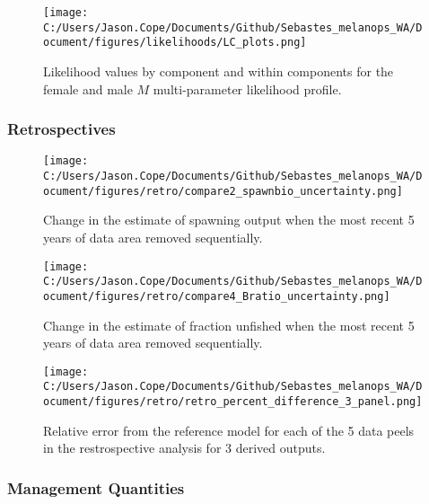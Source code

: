 \documentclass[11pt,
  letterpaper,
]{article}
\begin{document}
\pagebreak

\begin{figure}
{\centering
\texttt{[image: C:/Users/Jason.Cope/Documents/Github/Sebastes\_melanops\_WA/Document/figures/likelihoods/LC\_plots.png]}
}
\caption{Likelihood values by component and within components for the female and male $M$ multi-parameter likelihood profile.\label{fig:M-multiprofile-like-components}}
\end{figure}

\newpage

\hypertarget{retrospectives}{%
\subsubsection{Retrospectives}\label{retrospectives}}

\begin{figure}
{\centering
\texttt{[image: C:/Users/Jason.Cope/Documents/Github/Sebastes\_melanops\_WA/Document/figures/retro/compare2\_spawnbio\_uncertainty.png]}
}
\caption{Change in the estimate of spawning output when the most recent 5 years of data area removed sequentially.\label{fig:retro-ssb}}
\end{figure}

\pagebreak

\begin{figure}
{\centering
\texttt{[image: C:/Users/Jason.Cope/Documents/Github/Sebastes\_melanops\_WA/Document/figures/retro/compare4\_Bratio\_uncertainty.png]}
}
\caption{Change in the estimate of fraction unfished when the most recent 5 years of data area removed sequentially.\label{fig:retro-depl}}
\end{figure}

\newpage

\begin{figure}
{\centering
\texttt{[image: C:/Users/Jason.Cope/Documents/Github/Sebastes\_melanops\_WA/Document/figures/retro/retro\_percent\_difference\_3\_panel.png]}
}
\caption{Relative error from the reference model for each of the 5 data peels in the restrospective analysis for 3 derived outputs.\label{fig:retro-RE_comps}}
\end{figure}

\newpage

\hypertarget{management-quantities}{%
\subsubsection{Management Quantities}\label{management-quantities}}
\end{document}

